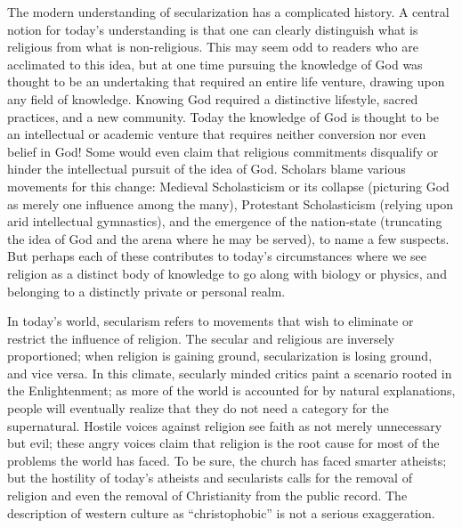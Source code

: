 The modern understanding of secularization has a complicated history. A central notion for today’s
understanding is that one can clearly distinguish what is religious from what is non-religious. This
may seem odd to readers who are acclimated to this idea, but at one time pursuing the knowledge of
God was thought to be an undertaking that required an entire life venture, drawing upon any field of
knowledge. Knowing God required a distinctive lifestyle, sacred practices, and a new community.
Today the knowledge of God is thought to be an intellectual or academic venture that requires
neither conversion nor even belief in God! Some would even claim that religious commitments
disqualify or hinder the intellectual pursuit of the idea of God. Scholars blame various movements
for this change: Medieval Scholasticism or its collapse (picturing God as merely one influence among
the many), Protestant Scholasticism (relying upon arid intellectual gymnastics), and the emergence
of the nation-state (truncating the idea of God and the arena where he may be served), to name a few
suspects. But perhaps each of these contributes to today’s circumstances where we see religion as a
distinct body of knowledge to go along with biology or physics, and belonging to a distinctly
private or personal realm.

In today’s world, secularism refers to movements that wish to eliminate or restrict the influence of
religion. The secular and religious are inversely proportioned; when religion is gaining ground,
secularization is losing ground, and vice versa. In this climate, secularly minded critics paint a
scenario rooted in the Enlightenment; as more of the world is accounted for by natural explanations,
people will eventually realize that they do not need a category for the supernatural. Hostile voices
against religion see faith as not merely unnecessary but evil; these angry voices claim that
religion is the root cause for most of the problems the world has faced. To be sure, the church has
faced smarter atheists; but the hostility of today’s atheists and secularists calls for the removal
of religion and even the removal of Christianity from the public record. The description of western
culture as “christophobic” is not a serious exaggeration.

